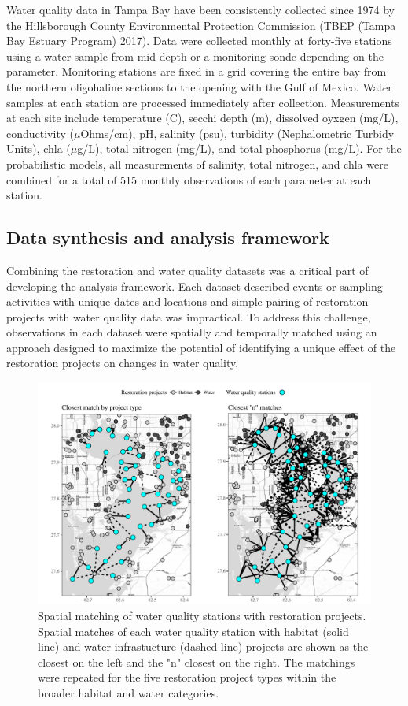 \documentclass[]{article}
\begin{document}
Water quality data in Tampa Bay have been consistently collected since
1974 by the Hillsborough County Environmental Protection Commission
(TBEP (Tampa Bay Estuary Program) \protect\hyperlink{ref-TBEP17}{2017}).
Data were collected monthly at forty-five stations using a water sample
from mid-depth or a monitoring sonde depending on the parameter.
Monitoring stations are fixed in a grid covering the entire bay from the
northern oligohaline sections to the opening with the Gulf of Mexico.
Water samples at each station are processed immediately after
collection. Measurements at each site include temperature (C), secchi
depth (m), dissolved oyxgen (mg/L), conductivity (\(\mu\)Ohms/cm), pH,
salinity (psu), turbidity (Nephalometric Turbidy Units), \ac{chla}
(\(\mu\)g/L), total nitrogen (mg/L), and total phosphorus (mg/L). For
the probabilistic models, all measurements of salinity, total nitrogen,
and \ac{chla} were combined for a total of 515 monthly observations of
each parameter at each station.

\subsection{Data synthesis and analysis
framework}\label{data-synthesis-and-analysis-framework}

Combining the restoration and water quality datasets was a critical part
of developing the analysis framework. Each dataset described events or
sampling activities with unique dates and locations and simple pairing
of restoration projects with water quality data was impractical. To
address this challenge, observations in each dataset were spatially and
temporally matched using an approach designed to maximize the potential
of identifying a unique effect of the restoration projects on changes in
water quality.

\begin{figure}
\includegraphics[width=\textwidth]{figs/spmtch-1} \caption{Spatial matching of water quality stations with restoration projects. Spatial matches of each water quality station with habitat (solid line) and water infrastucture (dashed line) projects are shown as the closest on the left and the "n" closest on the right.  The matchings were repeated for the five restoration project types within the broader habitat and water categories.}\label{fig:spmtch}
\end{figure}
\end{document}
